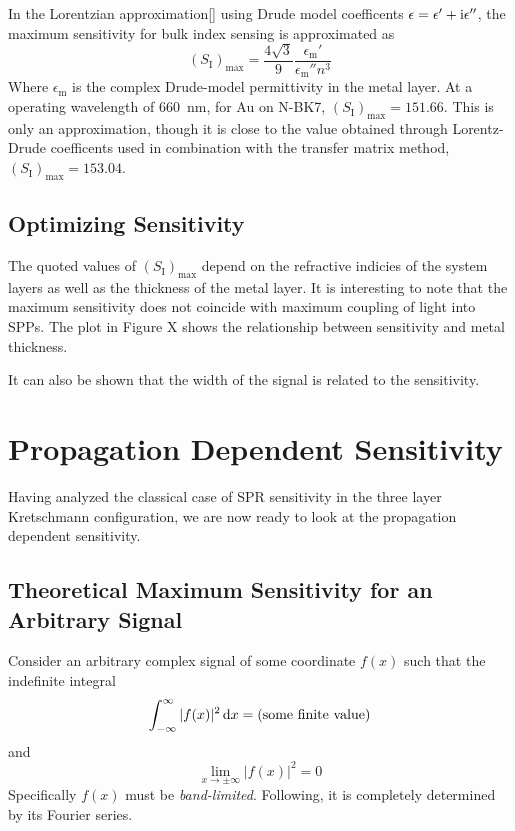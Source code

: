 \documentclass[a4paper,titlepage,onecolumn]{report}
\begin{document}
In the Lorentzian approximation{[}{]} using Drude model coefficents
$\epsilon=\epsilon'+{\mathrm{i}}\epsilon''$, the maximum sensitivity for bulk
index sensing is approximated as
\begin{equation}
(S_{\text{I}})_{\text{max}}=\frac{4\sqrt{3}}{9}\frac{\epsilon_{\mathrm{m}}'}{\epsilon_{\mathrm{m}}''n^{3}}
\end{equation}
Where $\epsilon_{\mathrm{m}}$ is the complex Drude-model permittivity
in the metal layer. At a operating wavelength of \SI{660}{\nano\meter},
for Au on N-BK7, $(S_{\mathrm{I}})_{\text{max}}=151.66$. This is
only an approximation, though it is close to the value obtained through
Lorentz-Drude coefficents used in combination with the transfer matrix
method, $(S_{\mathrm{I}})_{\text{max}}=153.04$.


\subsection{Optimizing Sensitivity}

The quoted values of $(S_{\mathrm{I}})_{\text{max}}$ depend on the
refractive indicies of the system layers as well as the thickness
of the metal layer. It is interesting to note that the maximum sensitivity
does not coincide with maximum coupling of light into SPPs. The plot
in Figure X shows the relationship between sensitivity and metal thickness.

It can also be shown that the width of the signal is related to the
sensitivity. 


\section{Propagation Dependent Sensitivity}

Having analyzed the classical case of SPR sensitivity in the three
layer Kretschmann configuration, we are now ready to look at the propagation
dependent sensitivity. 


\subsection{Theoretical Maximum Sensitivity for an Arbitrary Signal}

Consider an arbitrary complex signal of some coordinate $f(x)$ such
that the indefinite integral
\begin{equation}
\int_{-\infty}^{\infty}|f(x)|^{2}\,\mathrm{d} x=\text{(some finite value)}
\end{equation}
 and
\begin{equation}
\lim_{x\to\pm\infty}|f(x)|^{2}=0
\end{equation}
Specifically $f(x)$ must be \textit{band-limited}. Following, it is
completely determined by its Fourier series.
\end{document}
